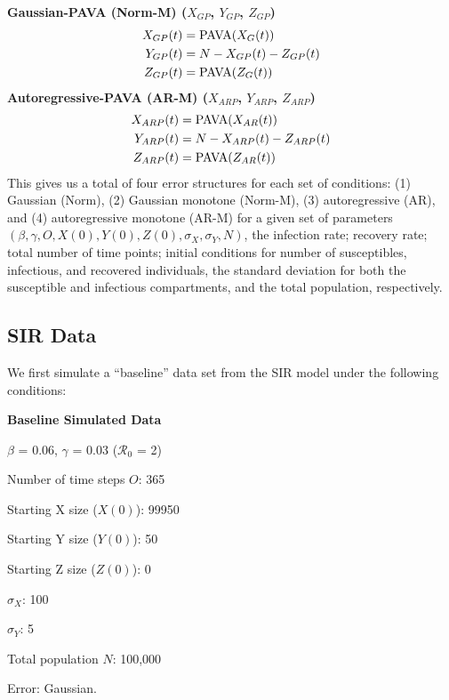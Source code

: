\documentclass[12pt]{article}
\newcommand{\rr}{\ensuremath{\mathcal{R}_0}}
\begin{document}
\noindent \textbf{Gaussian-PAVA (Norm-M) ($X_{GP}$, $Y_{GP}$, $Z_{GP}$)}
\begin{align*}
 X_{GP}(t) &= \textnormal{PAVA}(X_G(t)) \\
  Y_{GP}(t) &= N - X_{GP}(t) - Z_{GP}(t) \\
  Z_{GP}(t) &= \textnormal{PAVA}(Z_G(t)) \\
\end{align*}
\textbf{Autoregressive-PAVA (AR-M) ($X_{ARP}$, $Y_{ARP}$, $Z_{ARP}$)}
\begin{align*}
  X_{ARP}(t) &= \textnormal{PAVA}(X_{AR}(t)) \\
  Y_{ARP}(t) &= N - X_{ARP}(t) - Z_{ARP}(t) \\
  Z_{ARP}(t) &= \textnormal{PAVA}(Z_{AR}(t)) 
\end{align*}
This gives us a total of four error structures for each set of conditions: (1) Gaussian (Norm), (2) Gaussian monotone (Norm-M),  (3) autoregressive (AR), and (4) autoregressive monotone (AR-M) for a given set of parameters $\left (\beta, \gamma, O, X(0), Y(0), Z(0), \sigma_X, \sigma_Y, N \right )$, the infection rate; recovery rate; total number of time points; initial conditions for number of susceptibles, infectious, and recovered individuals, the standard deviation for both the susceptible and infectious compartments, and the total population, respectively.


\subsection{SIR Data}

We first simulate a ``baseline'' data set from the SIR model under the following conditions: 

\textbf{Baseline Simulated Data}
\begin{center}
	
	$\beta$ = 0.06, $\gamma$ = 0.03 ($\rr$ = 2)
	
	Number of time steps $O$: 365
	
	Starting X size ($X(0)$): 99950
	
	Starting Y size ($Y(0)$): 50
	
	Starting Z size ($Z(0)$): 0 
	
	$\sigma_X$: 100
	
	$\sigma_Y$: 5
	
	Total population $N$: 100,000

        Error: Gaussian.
	
      \end{center}
\end{document}
